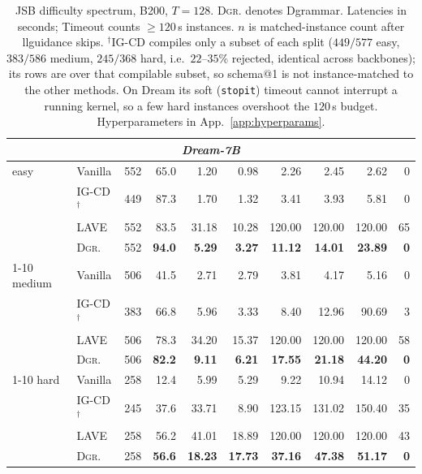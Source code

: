 \documentclass[11pt]{article}
\begin{document}
\begin{table}[t]
\begin{tabular}{llrrrrrrrr}
\midrule
\multicolumn{10}{c}{\textit{Dream-7B}} \\
\midrule
easy   & Vanilla       & 552 & 65.0          & 1.20          & 0.98          & 2.26           & 2.45           & 2.62            & 0 \\
       & IG-CD$^\dagger$ & 449 & 87.3        & 1.70          & 1.32          & 3.41           & 3.93           & 5.81            & 0 \\
       & LAVE          & 552 & 83.5          & 31.18         & 10.28         & 120.00         & 120.00         & 120.00          & 65 \\
       & \textsc{Dgr.} & 552 & \textbf{94.0} & \textbf{5.29} & \textbf{3.27}  & \textbf{11.12} & \textbf{14.01} & \textbf{23.89}  & \textbf{0} \\
\cmidrule(lr){1-10}
medium & Vanilla       & 506 & 41.5          & 2.71          & 2.79          & 3.81           & 4.17           & 5.16            & 0 \\
       & IG-CD$^\dagger$ & 383 & 66.8        & 5.96          & 3.33          & 8.40           & 12.96          & 90.69           & 3 \\
       & LAVE          & 506 & 78.3          & 34.20         & 15.37         & 120.00         & 120.00         & 120.00          & 58 \\
       & \textsc{Dgr.} & 506 & \textbf{82.2} & \textbf{9.11} & \textbf{6.21}  & \textbf{17.55} & \textbf{21.18} & \textbf{44.20}  & \textbf{0} \\
\cmidrule(lr){1-10}
hard   & Vanilla       & 258 & 12.4          & 5.99          & 5.29          & 9.22           & 10.94          & 14.12           & 0 \\
       & IG-CD$^\dagger$ & 245 & 37.6        & 33.71         & 8.90          & 123.15         & 131.02         & 150.40          & 35 \\
       & LAVE          & 258 & 56.2          & 41.01         & 18.89         & 120.00         & 120.00         & 120.00          & 43 \\
       & \textsc{Dgr.} & 258 & \textbf{56.6} & \textbf{18.23}& \textbf{17.73} & \textbf{37.16} & \textbf{47.38} & \textbf{51.17}  & \textbf{0} \\
\bottomrule
\end{tabular}
\caption{JSB difficulty spectrum, B200, $T{=}128$. \textsc{Dgr.} denotes Dgrammar. Latencies in seconds; Timeout counts $\geq\!120$\,s instances. $n$ is matched-instance count after llguidance skips. $^\dagger$IG-CD \citep{mundler2025} compiles only a subset of each split ($449/577$ easy, $383/586$ medium, $245/368$ hard, i.e.\ $22$--$35\%$ rejected, identical across backbones); its rows are over that compilable subset, so schema@1 is not instance-matched to the other methods. On Dream its soft (\texttt{stopit}) timeout cannot interrupt a running kernel, so a few hard instances overshoot the $120$\,s budget. Hyperparameters in App.~\ref{app:hyperparams}.}
\label{tab:main}
\end{table}
\end{document}
